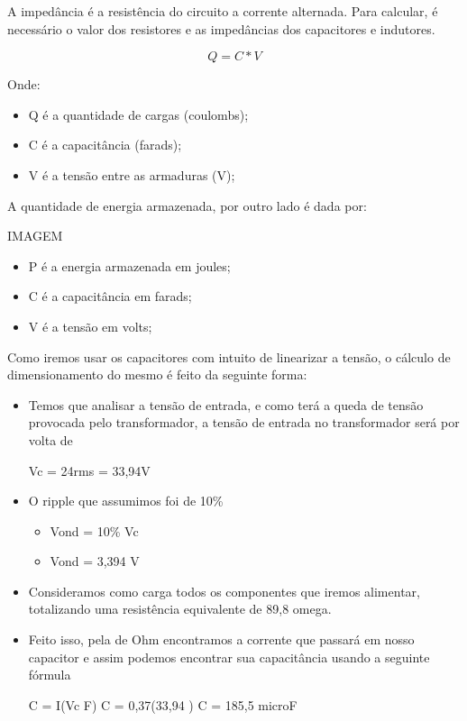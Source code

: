 A impedância é a resistência do circuito a corrente alternada. Para calcular, é necessário o valor dos resistores e as impedâncias dos capacitores e indutores.

\begin{equation}
    Q = C \ast V
\end{equation}

Onde:

\begin{itemize}
    \item Q é a quantidade de cargas (coulombs);
    \item C é a capacitância (farads);
    \item V é a tensão entre as armaduras (V);
\end{itemize}

A quantidade de energia armazenada, por outro lado é dada por:

IMAGEM

\begin{itemize}
    \item P é a energia armazenada em joules;
    \item C é a capacitância em farads;
    \item V é a tensão em volts;
\end{itemize}

Como iremos usar os capacitores com intuito de linearizar a tensão, o cálculo de dimensionamento do mesmo é feito da seguinte forma:

\begin{itemize}
    \item Temos que analisar a tensão de entrada, e como terá a queda de tensão provocada pelo transformador, a tensão de entrada no transformador será por volta de 
    
    Vc = 24rms = 33,94V
    \item O ripple que assumimos foi de 10\% 
    \begin{itemize}
        \item Vond = 10\% Vc
        \item Vond = 3,394 V
    \end{itemize}
\item Consideramos como carga todos os componentes que iremos alimentar, totalizando uma resistência equivalente de 89,8 omega.
    \item Feito isso, pela de Ohm encontramos a corrente que passará em nosso capacitor e assim podemos encontrar sua capacitância usando a seguinte fórmula
    
    C = I(Vc \* F)
    C = 0,37(33,94 )
    C = 185,5 microF
\end{itemize}

